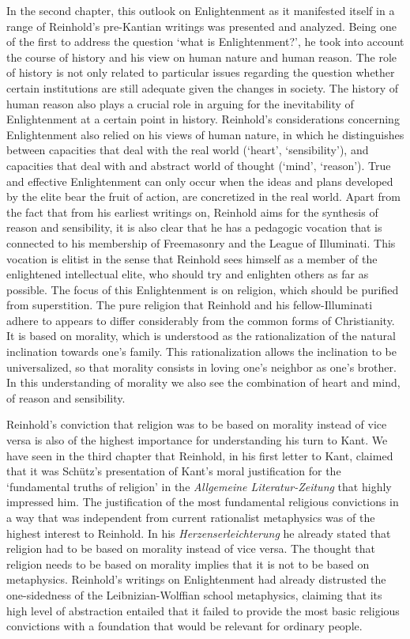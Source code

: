  In the second chapter, this outlook on Enlightenment as it manifested itself in a range of Reinhold's pre{-}Kantian writings was presented and analyzed. Being one of the first to address the question `what is Enlightenment?', he took into account the course of history and his view on human nature and human reason. The role of history is not only related to particular issues regarding the question whether certain institutions are still adequate given the changes in society. The history of human reason also plays a crucial role in arguing for the inevitability of Enlightenment at a certain point in history. Reinhold's considerations concerning Enlightenment also relied on his views of human nature, in which he distinguishes between capacities that deal with the real world (`heart', `sensibility'), and capacities that deal with and abstract world of thought (`mind', `reason'). True and effective Enlightenment can only occur when the ideas and plans developed by the elite bear the fruit of action, are concretized in the real world. Apart from the fact that from his earliest writings on, Reinhold aims for the synthesis of reason and sensibility, it is also clear that he has a pedagogic vocation that is connected to his membership of Freemasonry and the League of Illuminati. This vocation is elitist in the sense that Reinhold sees himself as a member of the enlightened intellectual elite, who should try and enlighten others as far as possible. The focus of this Enlightenment is on religion, which should be purified from superstition. The pure religion that Reinhold and his fellow{-}Illuminati adhere to appears to differ considerably from the common forms of Christianity. It is based on morality, which is understood as the rationalization of the natural inclination towards one's family. This rationalization allows the inclination to be universalized, so that morality consists in loving one's neighbor as one's brother. In this understanding of morality we also see the combination of heart and mind, of reason and sensibility.

 Reinhold's conviction that religion was to be based on morality instead of vice versa is also of the highest importance for understanding his turn to Kant. We have seen in the third chapter that Reinhold, in his first letter to Kant, claimed that it was Sch\"{u}tz's presentation of Kant's moral justification for the `fundamental truths of religion' in the \textit{Allgemeine Literatur{-}Zeitung} that highly impressed him. The justification of the most fundamental religious convictions in a way that was independent from current rationalist metaphysics was of the highest interest to Reinhold. In his \textit{Herzenserleichterung }he already stated that religion had to be based on morality instead of vice versa. The thought that religion needs to be based on morality implies that it is not to be based on metaphysics. Reinhold's writings on Enlightenment had already distrusted the one{-}sidedness of the Leibnizian{-}Wolffian school metaphysics, claiming that its high level of abstraction entailed that it failed to provide the most basic religious convictions with a foundation that would be relevant for ordinary people. 

